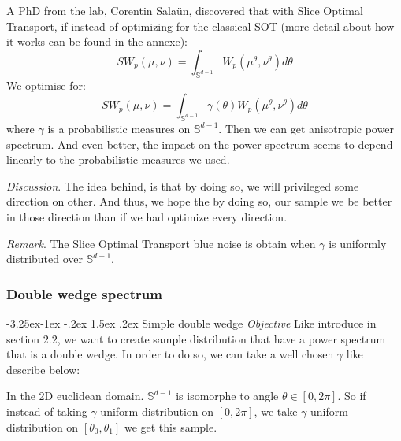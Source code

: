 \documentclass{classeENS}
\makeatletter
\newcounter{subsubsubsection}[subsubsection]
\newcommand\subsubsubsection{\@startsection{subsubsubsection}{4}{\z@}%
                                     {-3.25ex\@plus -1ex \@minus -.2ex}%
                                     {1.5ex \@plus .2ex}%
                                     {\normalfont\normalsize\bfseries}}
\makeatother
\begin{document}
\> A PhD from the lab, Corentin Salaün, discovered that with Slice Optimal Transport, 
if instead of optimizing for the classical SOT (more detail about how  it works can be found in the annexe):
\[SW_p(\mu, \nu) = \int_{\mathbb{S}^{d-1}} W_p(\mu^\theta,\nu^\theta) d\theta\]
We optimise for:
\[SW_p(\mu, \nu) = \int_{\mathbb{S}^{d-1}} \gamma(\theta) W_p(\mu^\theta,\nu^\theta) d\theta\]
where $\gamma$ is a probabilistic measures on $\mathbb{S}^{d-1}$. Then we can get anisotropic
power spectrum. And even better, the impact on the power spectrum seems to depend linearly to
the probabilistic measures we used.

\> \textit{Discussion}. The idea behind, is that by doing so, we will privileged some
    direction on other. And thus, we hope the by doing so, our sample we be better in
    those direction than if we had optimize every direction.
    
\> \textit{Remark}. The Slice Optimal Transport blue noise is obtain when 
    $\gamma$ is uniformly distributed over $\mathbb{S}^{d-1}$.

\subsubsection{Double wedge spectrum}

\subsubsubsection{Simple double wedge}
\textit{Objective} Like introduce in section $2.2$, we want to create sample distribution
    that have a power spectrum that is a double wedge. In order to do so, we can take
    a well chosen $\gamma$ like describe below:

In the 2D euclidean domain. $\mathbb{S}^{d-1}$ is isomorphe to angle $\theta \in [0,2\pi]$.
So if instead of taking $\gamma$ uniform distribution on $[0,2\pi]$, we take $\gamma$
uniform distribution on $[\theta_0,\theta_1]$ we get this sample.
\end{document}

